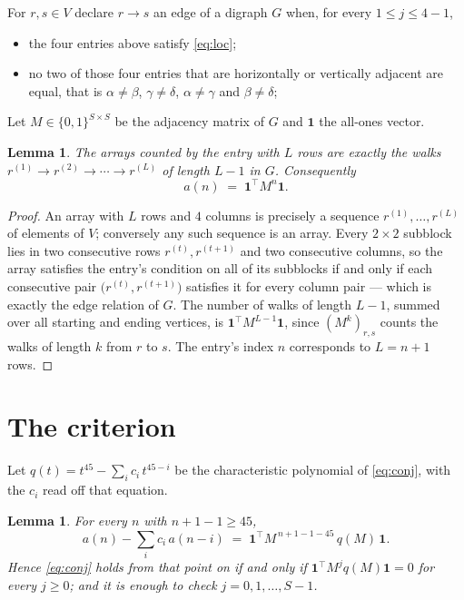 \documentclass[11pt,a4paper]{article}
\theoremstyle{plain}
\newtheorem{lemma}[theorem]{Lemma}
\theoremstyle{definition}
\begin{document}
For $r,s\in V$ declare $r\to s$ an edge of a digraph $G$ when, for every
$1\le j\le 4-1$,
\begin{itemize}
\item the four entries above satisfy \eqref{eq:loc};
\item no two of those four entries that are horizontally or vertically adjacent are equal, that is $\alpha\ne\beta$, $\gamma\ne\delta$, $\alpha\ne\gamma$ and $\beta\ne\delta$;
\end{itemize}
Let $M\in\{0,1\}^{S\times S}$ be the adjacency matrix of $G$ and $\mathbf{1}$ the
all-ones vector.

\begin{lemma}\label{lem:walk}
The arrays counted by the entry with $L$ rows are exactly the walks
$r^{(1)}\to r^{(2)}\to\cdots\to r^{(L)}$ of length $L-1$ in $G$. Consequently
\[
a(n)\;=\;\mathbf{1}^{\!\top}M^{n}\mathbf{1} .
\]
\end{lemma}

\begin{proof}
An array with $L$ rows and $4$ columns is precisely a sequence
$r^{(1)},\dots,r^{(L)}$ of elements of $V$; conversely any such sequence is an array.
Every $2\times2$ subblock lies in two consecutive rows $r^{(t)},r^{(t+1)}$ and two
consecutive columns, so the array satisfies the entry's condition on all of its subblocks
if and only if each consecutive pair $\bigl(r^{(t)},r^{(t+1)}\bigr)$ satisfies it for
every column pair --- which is exactly the edge relation of $G$. The number of walks of
length $L-1$, summed over all starting and ending vertices, is
$\mathbf{1}^{\!\top}M^{L-1}\mathbf{1}$, since $(M^{k})_{r,s}$ counts the walks of
length $k$ from $r$ to $s$. The entry's index $n$ corresponds to $L=n+1$ rows.
\end{proof}

\section{The criterion}

Let $q(t)=t^{45}-\sum_i c_i\,t^{45-i}$ be the characteristic polynomial of
\eqref{eq:conj}, with the $c_i$ read off that equation.

\begin{lemma}\label{lem:crit}
For every $n$ with $n+1-1\ge45$,
\[
a(n)-\sum_i c_i\,a(n-i)\;=\;\mathbf{1}^{\!\top}M^{\,n+1-1-45}\,q(M)\,\mathbf{1} .
\]
Hence \eqref{eq:conj} holds from that point on if and only if
$\mathbf{1}^{\!\top}M^{j}q(M)\mathbf{1}=0$ for every $j\ge0$; and it is enough to check
$j=0,1,\dots,S-1$.
\end{lemma}
\end{document}
